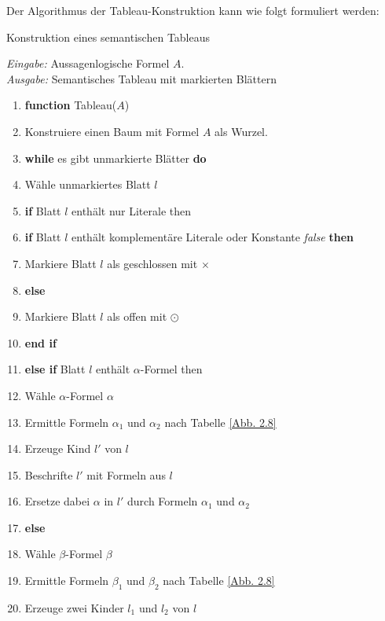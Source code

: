 Der Algorithmus der Tableau-Konstruktion kann wie folgt formuliert werden:
\begin{al}Konstruktion eines semantischen Tableaus \cite{Schaefer}\label{Algorithmus 2.64} \end{al} 
\textit{Eingabe:} Aussagenlogische Formel $A$.\\
\textit{Ausgabe:} Semantisches Tableau mit markierten Blättern
\begin{enumerate}[wide=0em, leftmargin=*, label=\arabic*, itemsep=0pt, parsep=0pt, font=\scriptsize]
\item \textbf{function} Tableau($A$)
\item {} Konstruiere einen Baum mit Formel $A$ als Wurzel.
\item \tabto{0.5cm} \textbf{while} es gibt unmarkierte Blätter \textbf{do} 
\item \tabto{0.5cm} Wähle unmarkiertes Blatt $l$
\item \tabto{1cm}\textbf{if}  Blatt $l$ enthält nur Literale then
\item \tabto{1.5cm} \textbf{if} Blatt $l$ enthält komplementäre Literale oder Konstante \textit{false} \textbf{then}
\item \tabto{2cm} Markiere Blatt $l$ als geschlossen mit $\times$ 
\item \tabto{1.5cm} \textbf{else} 
\item \tabto{2cm} Markiere Blatt $l$ als offen mit $\odot$
\item \tabto{1.5cm} \textbf{end if} 
\item \tabto{1cm} \textbf{else if}  Blatt $l$ enthält $\alpha$-Formel then
\item \tabto{1.5cm} Wähle $\alpha$-Formel $\alpha$
\item \label{TableauAl_13} \tabto{1.5cm} Ermittle Formeln $\alpha_1$ und $\alpha_2$ nach Tabelle \ref{Abb. 2.8} 
\item \tabto{1.5cm} Erzeuge Kind $l'$ von $l$
\item \tabto{1.5cm} Beschrifte $l'$ mit Formeln aus $l$
\item \label{TableauAl_16}\tabto{1.5cm} Ersetze dabei $\alpha$ in $l'$ durch Formeln $\alpha_1$  und $\alpha_2$
\item \tabto{1cm} \textbf{else} 
\item \tabto{1.5cm} Wähle  $\beta$-Formel $\beta$
\item \label{TableauAl_19} \tabto{1.5cm} Ermittle Formeln $\beta_1$ und $\beta_2$ nach Tabelle \ref{Abb. 2.8}
\item \tabto{1.5cm} Erzeuge zwei Kinder $l_1$ und $l_2$ von $l$

\end{enumerate}
